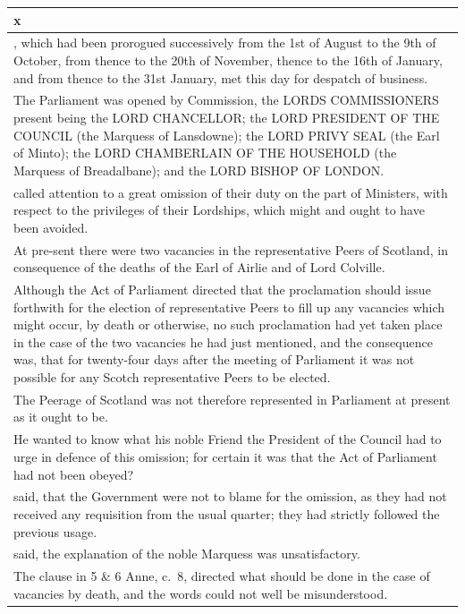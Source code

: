 \documentclass[
]{article}
\begin{document}
\begin{longtable}[]{@{}
  >{\raggedright\arraybackslash}p{}@{}}
\toprule\noalign{}
\begin{minipage}[b]{\linewidth}\raggedright
x
\end{minipage} \\
\midrule\noalign{}
\endhead
\bottomrule\noalign{}
\endlastfoot
, which had been prorogued successively from the 1st of August to the
9th of October, from thence to the 20th of November, thence to the 16th
of January, and from thence to the 31st January, met this day for
despatch of business. \\
The Parliament was opened by Commission, the LORDS COMMISSIONERS present
being the LORD CHANCELLOR; the LORD PRESIDENT OF THE COUNCIL (the
Marquess of Lansdowne); the LORD PRIVY SEAL (the Earl of Minto); the
LORD CHAMBERLAIN OF THE HOUSEHOLD (the Marquess of Breadalbane); and the
LORD BISHOP OF LONDON. \\
called attention to a great omission of their duty on the part of
Ministers, with respect to the privileges of their Lordships, which
might and ought to have been avoided. \\
At pre-sent there were two vacancies in the representative Peers of
Scotland, in consequence of the deaths of the Earl of Airlie and of Lord
Colville. \\
Although the Act of Parliament directed that the proclamation should
issue forthwith for the election of representative Peers to fill up any
vacancies which might occur, by death or otherwise, no such proclamation
had yet taken place in the case of the two vacancies he had just
mentioned, and the consequence was, that for twenty-four days after the
meeting of Parliament it was not possible for any Scotch representative
Peers to be elected. \\
The Peerage of Scotland was not therefore represented in Parliament at
present as it ought to be. \\
He wanted to know what his noble Friend the President of the Council had
to urge in defence of this omission; for certain it was that the Act of
Parliament had not been obeyed? \\
said, that the Government were not to blame for the omission, as they
had not received any requisition from the usual quarter; they had
strictly followed the previous usage. \\
said, the explanation of the noble Marquess was unsatisfactory. \\
The clause in 5 \& 6 Anne, c.~8, directed what should be done in the
case of vacancies by death, and the words could not well be
misunderstood. \\
\end{longtable}
\end{document}
